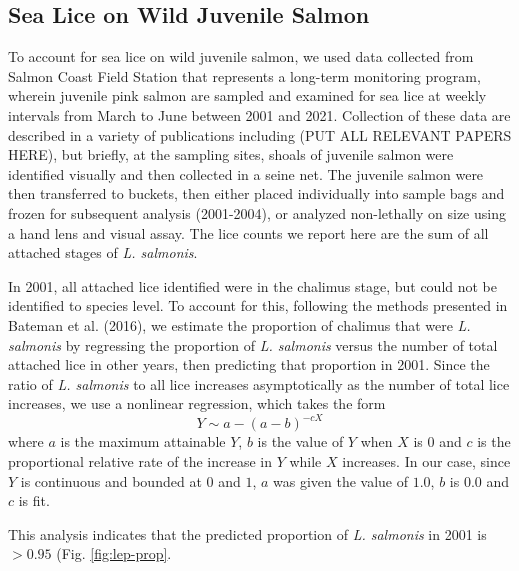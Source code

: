 \documentclass{article}
\begin{document}
\subsection{Sea Lice on Wild Juvenile Salmon}

To account for sea lice on wild juvenile salmon, we used data collected from Salmon Coast Field Station that represents a long-term monitoring program, wherein juvenile pink salmon are sampled and examined for sea lice at weekly intervals from March to June between 2001 and 2021. Collection of these data are described in a variety of publications including (PUT ALL RELEVANT PAPERS HERE), but briefly, at the sampling sites, shoals of juvenile salmon were identified visually and then collected in a seine net. The juvenile salmon were then transferred to buckets, then either placed individually into sample bags and frozen for subsequent analysis (2001-2004), or analyzed non-lethally on size using a hand lens and visual assay. The lice counts we report here are the sum of all attached stages of \textit{L. salmonis}. 

In 2001, all attached lice identified were in the chalimus stage, but could not be identified to species level. To account for this, following the methods presented in Bateman et al. (2016), we estimate the proportion of chalimus that were \textit{L. salmonis} by regressing the proportion of \textit{L. salmonis} versus the number of total attached lice in other years, then predicting that proportion in 2001. Since the ratio of \textit{L. salmonis} to all lice increases asymptotically as the number of total lice increases, we use a nonlinear regression, which takes the form $$Y \sim a - (a - b)^{-cX}$$ where $a$ is the maximum attainable $Y$, $b$ is the value of $Y$ when $X$ is $0$ and $c$ is the proportional relative rate of the increase in $Y$ while $X$ increases. In our case, since $Y$ is continuous and bounded at $0$ and $1$, $a$ was given the value of $1.0$, $b$ is $0.0$ and $c$ is fit. 

This analysis indicates that the predicted proportion of \textit{L. salmonis} in 2001 is $>0.95$ (Fig. \ref{fig:lep-prop}.
\end{document}
